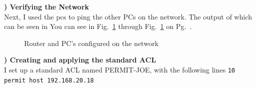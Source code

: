 \documentclass{report}
\newcommand{\mysubsection}[2]{\textbf{\romannumeral #1) #2}}
\begin{document}
\noindent\mysubsection{2}{Verifying the Network}\\
Next, I used the pcs to ping the other PCs on the network. The output of which
can be seen in You can see in Fig.~\ref{Net17} through
Fig.~\ref{Net17}
on Pg.~\pageref{Net17}.



\begin{figure}[!hbt]\centering
{}\hfill
{}\par
{}\hfill
{}\par
\caption{Router and PC's configured on the network}\label{Net17}
\end{figure}


\noindent\mysubsection{3}{Creating and applying the standard ACL}\\
I set up a standard ACL named PERMIT-JOE, with the following lines
{\scriptsize{\verb$10 permit host 192.168.20.18$}\normalsize} 
\end{document}
